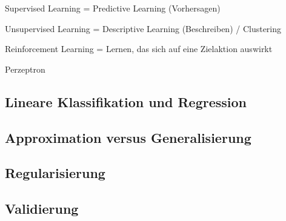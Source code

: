 \begin{defi}{Supervised Learning}
    = Predictive Learning (Vorhersagen)
\end{defi}

\begin{defi}{Unsupervised Learning}
    = Descriptive Learning (Beschreiben) / Clustering
\end{defi}

\begin{defi}{Reinforcement Learning}
    = Lernen, das sich auf eine Zielaktion auswirkt
\end{defi}

\begin{defi}{Perzeptron}
    
\end{defi}



\subsection{Lineare Klassifikation und Regression}

\subsection{Approximation versus Generalisierung}

\subsection{Regularisierung}

\subsection{Validierung}